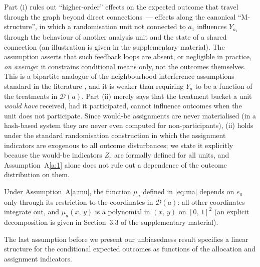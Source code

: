 \documentclass[sigconf,anonymous,review]{acmart}
\newcounter{assumption}
\begin{document}
Part (i) rules out ``higher-order'' effects on the expected outcome that travel through the graph beyond direct connections~--- effects along the canonical ``M-structure'', in which a randomisation unit not connected to $a_1$ influences $Y_{a_1}$ through the behaviour of another analysis unit and the state of a shared connection (an illustration is given in the supplementary material). The assumption asserts that such feedback loops are absent, or negligible in practice, \emph{on average}: it constrains conditional means only, not the outcomes themselves. This is a bipartite analogue of the neighbourhood-interference assumptions standard in the literature \cite{aronow2017estimating,harshaw2023erl,shi2025scalableanalysisbipartiteexperiments}, and it is weaker than requiring $Y_a$ to be a function of the treatments in $\mathcal D(a)$. Part (ii) merely says that the treatment bucket a unit \emph{would have} received, had it participated, cannot influence outcomes when the unit does not participate. Since would-be assignments are never materialised (in a hash-based system they are never even computed for non-participants), (ii) holds under the standard randomisation construction in which the assignment indicators are exogenous to all outcome disturbances; we state it explicitly because the would-be indicators $Z_r$ are formally defined for all units, and Assumption~A\ref{a:1} alone does not rule out a dependence of the outcome distribution on them.


Under Assumption~A\ref{a:mu}, the function $\mu_a$ defined in \eqref{eq:ma} depends on $e_a$ only through its restriction to the coordinates in $\mathcal D(a)$: all other coordinates integrate out, and $\mu_a(x,\,y)$ is a polynomial in $(x,\,y)$ on $[0,\,1]^2$ (an explicit decomposition is given in Section~3.3 of the supplementary material).

The last assumption before we present our unbiasedness result specifies a linear structure for the conditional expected outcomes as functions of the allocation and assignment indicators.
\end{document}
